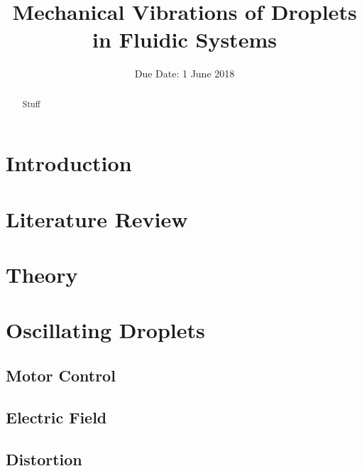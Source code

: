 \documentclass{physics_article_B}
\title{Mechanical Vibrations of Droplets in Fluidic Systems}
\date{Due Date: 1 June 2018}
\begin{document}
	
\setcounter{page}{0}
%

\begin{abstract}
	\large{Stuff
}
\end{abstract}
	

\tableofcontents

\setcounter{page}{1}
	
\newpage
{} 
\setcounter{page}{1}

\newpage

\section{Introduction\label{sect:intro}}

\section{Literature Review\label{sect:litrev}}

\section{Theory\label{sect:theory}}

\section{Oscillating Droplets}
    \subsection{Motor Control}
	\subsection{Electric Field}
	\subsection{Distortion}
\end{document}
